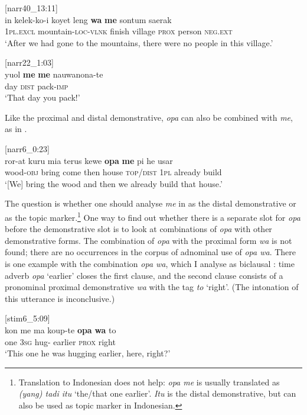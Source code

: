 \documentclass[output=paper,colorlinks,citecolor=brown]{langscibook}
\begin{document}
	\ea 	\label{exe:lengwame} [narr40\_13:11]\\
	\gll in kelek-ko-i koyet leng \textbf{wa} \textbf{me} sontum saerak\\
		\textsc{1pl.excl} mountain-\textsc{loc-vlnk} finish village \textsc{prox} {\glme} person \textsc{neg.ext}\\	
	\glt	`After we had gone to the mountains, there were no people in this village.' 
	\z 

	\ea 	\label{exe:yuolmeme} [narr22\_1:03]\\
	\gll yuol \textbf{me} \textbf{me} nauwanona-te\\
		day \textsc{dist} {\glme} pack-\textsc{imp}\\	
	\glt	`That day you pack!' 
	\z 

Like the proximal and distal demonstrative, \textit{opa} can also be combined with \textit{me}, as in .

	\ea \label{exe:opame} [narr6\_0:23]\\
	\gll ror-at kuru mia terus kewe \textbf{opa} \textbf{me} pi he usar\\
		wood-\textsc{obj} bring come then house {\glopa} \textsc{top/dist} \textsc{1pl} already build\\
	\glt	`[We] bring the wood and then we already build that house.' 
	\z 

The question is whether one should analyse \textit{me} in  as the distal demonstrative or as the topic marker.\footnote{Translation to Indonesian does not help: \textit{opa me} is usually translated as \textit{(yang) tadi itu} `the/that one earlier'. \textit{Itu} is the distal demonstrative, but can also be used as topic marker in Indonesian.} One way to find out whether there is a separate slot for \textit{opa} before the demonstrative slot is to look at combinations of \textit{opa} with other demonstrative forms. The combination of \textit{opa} with the proximal form \textit{wa} is not found; there are no occurrences in the corpus of adnominal use of \textit{opa wa}. There is one example with the combination \textit{opa wa}, which I analyse as biclausal : time adverb \textit{opa} `earlier' closes the first clause, and the second clause consists of a pronominal proximal demonstrative \textit{wa} with the tag \textit{to} `right'. (The intonation of this utterance is inconclusive.)

	\ea \label{exe:opawa} [stim6\_5:09]\\
	\gll {\ob}kon me ma koup-te \textbf{opa}{\cb} \textbf{wa} to\\
		one {\glme} \textsc{3sg} hug-{\glte} earlier \textsc{prox} right\\
	\glt	`This one he was hugging earlier, here, right?' 
	\z 
\end{document}
